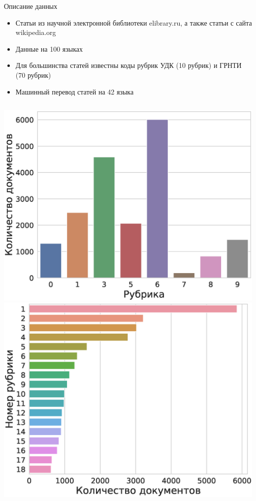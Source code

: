 \documentclass{beamer}
\begin{document}
\begin{frame}{Описание данных}

\begin{itemize}
    \item Статьи из научной электронной библиотеки elibrary.ru, а также статьи с сайта wikipedia.org
    \item Данные на 100 языках
    \item Для большинства статей известны коды рубрик УДК (10 рубрик) и ГРНТИ (70 рубрик)
    \item Машинный перевод статей на 42 языка
\end{itemize}

\begin{columns}[c]
\includegraphics[width=1.0\textwidth]{udk.eps}
\includegraphics[width=1.0\textwidth]{grnti.eps}
\end{columns}

\end{frame}
\end{document}
